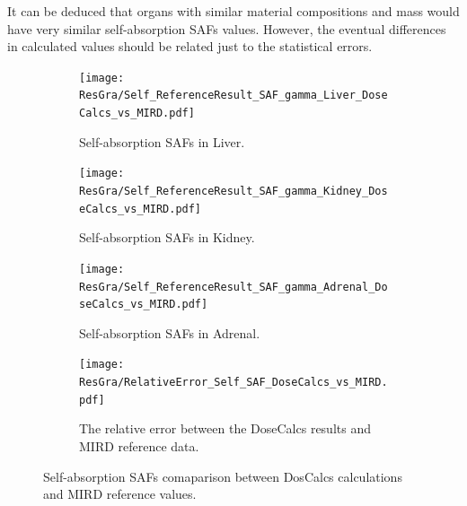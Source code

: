 \documentclass[letterpaper,12pt]{article}
\begin{document}
It can be deduced that organs with similar material compositions and mass would have very similar self-absorption SAFs values. However, the eventual differences in calculated values should be related just to the statistical errors.

\begin{figure} [H]
\begin{subfigure}[t]{.5\textwidth}
  \centering
  \texttt{[image: ResGra/Self\_ReferenceResult\_SAF\_gamma\_Liver\_DoseCalcs\_vs\_MIRD.pdf]}  
  \caption{Self-absorption SAFs in Liver.}
  \label{fig:SelfCompLiver}
\end{subfigure}\hspace{.01\textwidth}
\begin{subfigure}[t]{.5\textwidth}
  \centering
  \texttt{[image: ResGra/Self\_ReferenceResult\_SAF\_gamma\_Kidney\_DoseCalcs\_vs\_MIRD.pdf]}  
  \caption{Self-absorption SAFs in Kidney.}
  \label{fig:SelfCompKidney}
\end{subfigure}\vspace{.06\textwidth}
\begin{subfigure}[t]{.5\textwidth}
  \centering
  \texttt{[image: ResGra/Self\_ReferenceResult\_SAF\_gamma\_Adrenal\_DoseCalcs\_vs\_MIRD.pdf]}  
  \caption{Self-absorption SAFs in Adrenal.}
  \label{fig:SelfCompAdrenal}
\end{subfigure}\hspace{.01\textwidth}
\begin{subfigure}[t]{.5\textwidth}
  \centering
    \texttt{[image: ResGra/RelativeError\_Self\_SAF\_DoseCalcs\_vs\_MIRD.pdf]}  
  \caption{The relative error between the DoseCalcs results and MIRD reference data.}
  \label{fig:Self_Rel_Error}
\end{subfigure}

\caption{Self-absorption SAFs comaparison between DosCalcs calculations and MIRD reference values. }
\end{figure}
\end{document}
